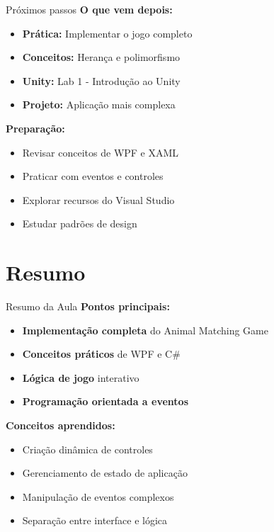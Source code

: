 \documentclass[aspectratio=169]{beamer}
\begin{document}
\begin{frame}{Próximos passos}
\textbf{O que vem depois:}
\begin{itemize}
    \item \textbf{Prática:} Implementar o jogo completo
    \item \textbf{Conceitos:} Herança e polimorfismo
    \item \textbf{Unity:} Lab 1 - Introdução ao Unity
    \item \textbf{Projeto:} Aplicação mais complexa
\end{itemize}

\textbf{Preparação:}
\begin{itemize}
    \item Revisar conceitos de WPF e XAML
    \item Praticar com eventos e controles
    \item Explorar recursos do Visual Studio
    \item Estudar padrões de design
\end{itemize}
\end{frame}

\section{Resumo}

\begin{frame}{Resumo da Aula}
\textbf{Pontos principais:}
\begin{itemize}
    \item \textbf{Implementação completa} do Animal Matching Game
    \item \textbf{Conceitos práticos} de WPF e C\#
    \item \textbf{Lógica de jogo} interativo
    \item \textbf{Programação orientada a eventos}
\end{itemize}

\textbf{Conceitos aprendidos:}
\begin{itemize}
    \item Criação dinâmica de controles
    \item Gerenciamento de estado de aplicação
    \item Manipulação de eventos complexos
    \item Separação entre interface e lógica
\end{itemize}
\end{frame}
\end{document}
